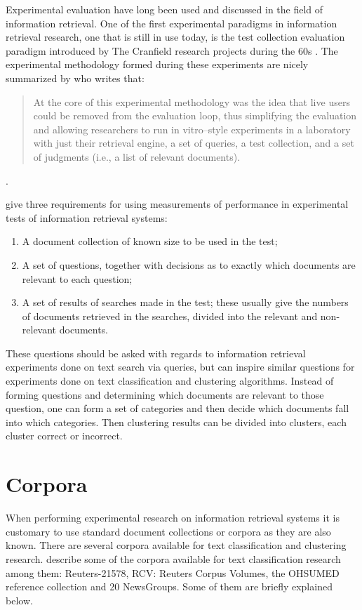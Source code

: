 Experimental evaluation have long been used and discussed in the field of information retrieval. One of the first experimental paradigms in information retrieval research, one that is still in use today, is the test collection evaluation paradigm introduced by The Cranfield research projects during the 60s \cite{Cleverdon1966}. The experimental methodology formed during these experiments are nicely summarized by \cite[p. 564]{Voorhees2005} who writes that:

\begin{quote}
At the core of this experimental methodology was the idea that live users could be removed from the evaluation loop, thus simplifying the evaluation and allowing researchers to run in vitro–style experiments in a laboratory with just their retrieval engine, a set of queries, a test collection, and a set of judgments (i.e., a list of relevant documents).
\end{quote}.

\cite[p. 33]{Cleverdon1966} give three requirements for using measurements of performance in experimental tests of information retrieval systems:
\begin{enumerate}
\item A document collection of known size to be used in the test;
\item A set of questions, together with decisions as to exactly which documents are relevant to each question;
\item A set of results of searches made in the test; these usually give the numbers of documents retrieved in the searches, divided into the relevant and non-relevant documents.
\end{enumerate}
These questions should be asked with regards to information retrieval experiments done on text search via queries, but can inspire similar questions for experiments done on text classification and clustering algorithms. Instead of forming questions and determining which documents are relevant to those question, one can form a set of categories and then decide which documents fall into which categories. Then clustering results can be divided into clusters, each cluster correct or incorrect.

\section{Corpora}
\label{Corpora}

When performing experimental research on information retrieval systems it is customary to use standard document collections or corpora as they are also known. There are several corpora available for text classification and clustering research. \cite{Baeza-Yates2011a} describe some of the corpora available for text classification research among them: Reuters-21578, RCV: Reuters Corpus Volumes, the OHSUMED reference collection and 20 NewsGroups. Some of them are briefly explained below.

